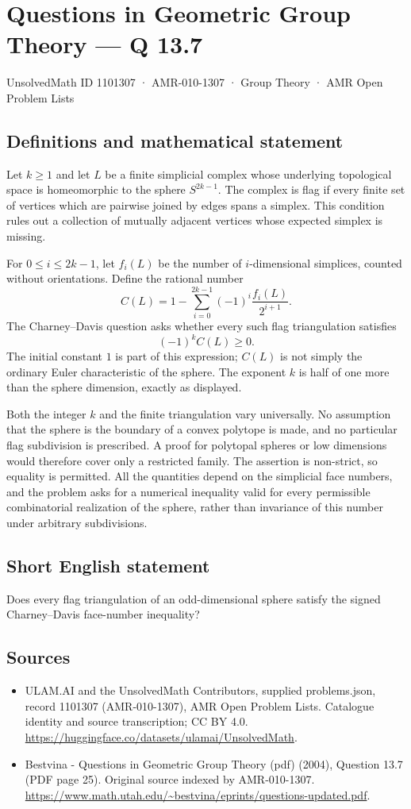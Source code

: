 \documentclass[11pt,a4paper]{article}
\begin{document}
\section*{Questions in Geometric Group Theory — Q 13.7}\label{1101307}
{\small UnsolvedMath ID 1101307 · AMR-010-1307 · Group Theory · AMR Open Problem Lists}
\subsection{Definitions and mathematical statement}
Let $k\geq1$ and let $L$ be a finite simplicial complex whose underlying topological space is homeomorphic to the sphere $S^{2k-1}$. The complex is flag if every finite set of vertices which are pairwise joined by edges spans a simplex. This condition rules out a collection of mutually adjacent vertices whose expected simplex is missing.

For $0\leq i\leq2k-1$, let $f_i(L)$ be the number of $i$-dimensional simplices, counted without orientations. Define the rational number
\[
 C(L)=1-\sum_{i=0}^{2k-1}(-1)^i\frac{f_i(L)}{2^{i+1}}.
\]
The Charney--Davis question asks whether every such flag triangulation satisfies
\[
 (-1)^k C(L)\geq0.
\]
The initial constant $1$ is part of this expression; $C(L)$ is not simply the ordinary Euler characteristic of the sphere. The exponent $k$ is half of one more than the sphere dimension, exactly as displayed.

Both the integer $k$ and the finite triangulation vary universally. No assumption that the sphere is the boundary of a convex polytope is made, and no particular flag subdivision is prescribed. A proof for polytopal spheres or low dimensions would therefore cover only a restricted family. The assertion is non-strict, so equality is permitted. All the quantities depend on the simplicial face numbers, and the problem asks for a numerical inequality valid for every permissible combinatorial realization of the sphere, rather than invariance of this number under arbitrary subdivisions.
\subsection{Short English statement}
Does every flag triangulation of an odd-dimensional sphere satisfy the signed Charney–Davis face-number inequality?
\subsection{Sources}
\begin{itemize}
\item[S1] ULAM.AI and the UnsolvedMath Contributors, supplied problems.json, record 1101307 (AMR-010-1307), AMR Open Problem Lists. Catalogue identity and source transcription; CC BY 4.0.
\url{https://huggingface.co/datasets/ulamai/UnsolvedMath}.
\item[S2] Bestvina - Questions in Geometric Group Theory (pdf) (2004), Question 13.7 (PDF page 25). Original source indexed by AMR-010-1307.
\url{https://www.math.utah.edu/~bestvina/eprints/questions-updated.pdf}.
\end{itemize}
\end{document}
